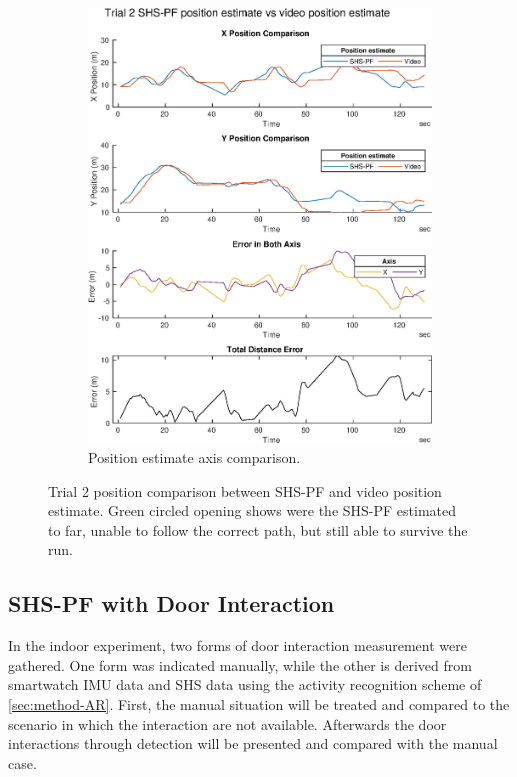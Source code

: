 \begin{figure}[H]
\begin{subfigure}[t]{.45\textwidth}
		\includegraphics[width=\linewidth]{images/20201129_1904_trial_2_traj_1}
		\caption{Position estimate axis comparison.}
		\label{fig:shspf_trial2_comparison}
	\end{subfigure}
	\setlength{\belowcaptionskip}{-20pt}
	\caption{Trial 2 position comparison between SHS-PF and video position estimate. Green circled opening shows were the SHS-PF estimated to far, unable to follow the correct path, but still able to survive the run.}
	\label{fig:shspf_trial2_shs_gt_comparison}
\end{figure}

\subsection{SHS-PF with Door Interaction}
In the indoor experiment, two forms of door interaction measurement were gathered. One form was indicated manually, while the other is derived from smartwatch \ac{IMU} data and \ac{SHS} data using the activity recognition scheme of \cref{sec:method-AR}.  First, the manual situation will be treated and compared to the scenario in which the interaction are not available. Afterwards the door interactions through detection will be presented and compared with the manual case.\par


